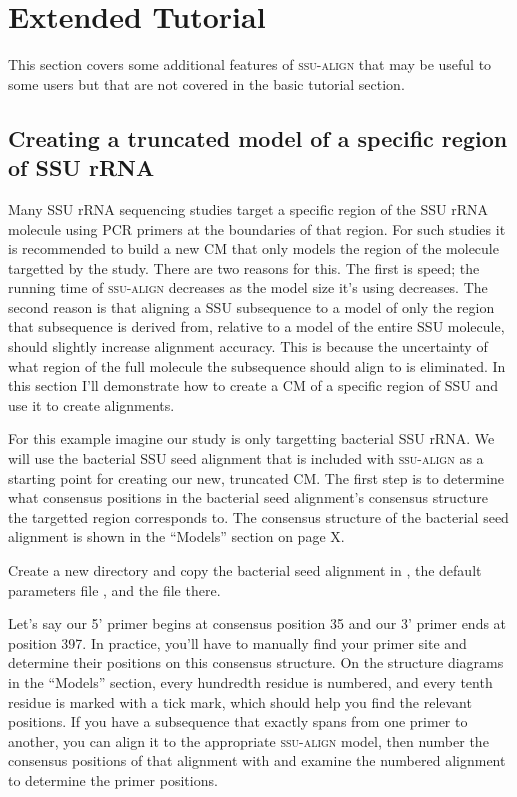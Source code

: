 \section{Extended Tutorial}

This section covers some additional features of \textsc{ssu-align}
that may be useful to some users but that are not covered in the basic
tutorial section. 

\subsection{Creating a truncated model of a specific region of SSU rRNA}

Many SSU rRNA sequencing studies target a specific region of the SSU
rRNA molecule using PCR primers at the boundaries of that region. For
such studies it is recommended to build a new CM that only models the
region of the molecule targetted by the study. There are two reasons
for this. The first is speed; the running time of \textsc{ssu-align}
decreases as the model size it's using decreases. The second reason is
that aligning a SSU subsequence to a model of only the region that
subsequence is derived from, relative to a model of the entire SSU
molecule, should slightly increase alignment accuracy. This is because
the uncertainty of what region of the full molecule the subsequence
should align to is eliminated. In this section I'll demonstrate how to
create a CM of a specific region of SSU and use it to create
alignments. 

For this example imagine our study is only targetting bacterial SSU
rRNA. We will use the bacterial SSU seed alignment that is included
with \textsc{ssu-align} as a starting point for creating our new,
truncated CM. The first step is to determine what consensus positions
in the bacterial seed alignment's consensus structure the targetted
region corresponds to. The consensus structure of the bacterial seed
alignment is shown in the ``Models'' section on page X.

Create a new directory and copy the bacterial seed alignment in
, the default parameters
file , and the file 
there.

Let's say our 5' primer begins at consensus position 35 and our 3'
primer ends at position 397.  In practice, you'll have to manually
find your primer site and determine their positions on this consensus
structure. On the structure diagrams in the ``Models'' section, every
hundredth residue is numbered, and every tenth residue is marked with
a tick mark, which should help you find the relevant positions.  If
you have a subsequence that exactly spans from one primer to another,
you can align it to the appropriate \textsc{ssu-align} model, then
number the consensus positions of that alignment with
 and examine the numbered alignment to
determine the primer positions.


